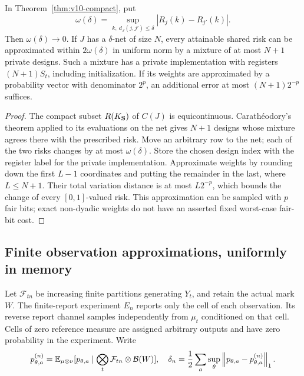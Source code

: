 \begin{corollary}\label{cor:v10-seeds}
In Theorem~\ref{thm:v10-compact}, put
\[
 \omega(\delta)=\sup_{k,\ d_J(j,j')\le\delta}
                   |R_j(k)-R_{j'}(k)|.
\]
Then $\omega(\delta)\to0$. If $J$ has a $\delta$-net of size $N$,
every attainable shared risk can be approximated within $2\omega(\delta)$
in uniform norm by a mixture of at most $N+1$ private designs.
Such a mixture has a private implementation with registers
$(N+1)S_t$, including initialization. If its weights are approximated
by a probability vector with denominator $2^p$, an additional error
at most $(N+1)2^{-p}$ suffices.
\end{corollary}
\begin{proof}
The compact subset $R(K_{\bf S})$ of $C(J)$ is equicontinuous.
Carath\'eodory's theorem applied to its evaluations on the net gives
$N+1$ designs whose mixture agrees there with the prescribed risk.
Move an arbitrary row to the net; each of the two risks changes by at
most $\omega(\delta)$. Store the chosen design index with the register
label for the private implementation. Approximate weights by rounding
down the first $L-1$ coordinates and putting the remainder in the last,
where $L\le N+1$. Their total variation distance is at most $L2^{-p}$,
which bounds the change of every $[0,1]$-valued risk. This approximation
can be sampled with $p$ fair bits; exact non-dyadic weights do not have
an asserted fixed worst-case fair-bit cost.
\end{proof}

\subsection{Finite observation approximations, uniformly in memory}
Let $\mathcal F_{tn}$ be increasing finite partitions generating $Y_t$,
and retain the actual mark $W$. The finite-report experiment $E_n$
reports only the cell of each observation. Its reverse report channel
samples independently from $\mu_t$ conditioned on that cell. Cells of
zero reference measure are assigned arbitrary outputs and have zero
probability in the experiment. Write
\[
 p^{(n)}_{\theta,a}
 =\mathbb E_{\mu\otimes\nu}
   [p_{\theta,a}\mid\bigotimes_t\mathcal F_{tn}\otimes\mathcal B(W)],
 \quad
 \delta_n=\frac12\sum_a\sup_\theta
             \left\lVert p_{\theta,a}-p^{(n)}_{\theta,a}\right\rVert_1.
\]

